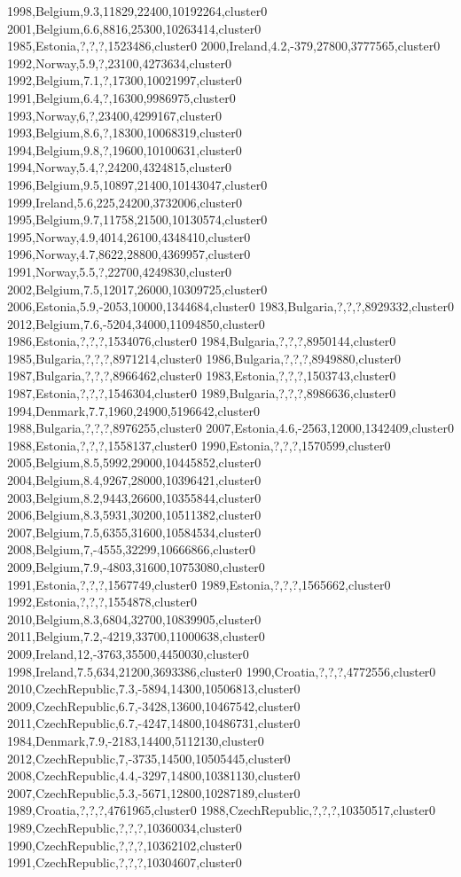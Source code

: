 1998,Belgium,9.3,11829,22400,10192264,cluster0
2001,Belgium,6.6,8816,25300,10263414,cluster0
1985,Estonia,?,?,?,1523486,cluster0
2000,Ireland,4.2,-379,27800,3777565,cluster0
1992,Norway,5.9,?,23100,4273634,cluster0
1992,Belgium,7.1,?,17300,10021997,cluster0
1991,Belgium,6.4,?,16300,9986975,cluster0
1993,Norway,6,?,23400,4299167,cluster0
1993,Belgium,8.6,?,18300,10068319,cluster0
1994,Belgium,9.8,?,19600,10100631,cluster0
1994,Norway,5.4,?,24200,4324815,cluster0
1996,Belgium,9.5,10897,21400,10143047,cluster0
1999,Ireland,5.6,225,24200,3732006,cluster0
1995,Belgium,9.7,11758,21500,10130574,cluster0
1995,Norway,4.9,4014,26100,4348410,cluster0
1996,Norway,4.7,8622,28800,4369957,cluster0
1991,Norway,5.5,?,22700,4249830,cluster0
2002,Belgium,7.5,12017,26000,10309725,cluster0
2006,Estonia,5.9,-2053,10000,1344684,cluster0
1983,Bulgaria,?,?,?,8929332,cluster0
2012,Belgium,7.6,-5204,34000,11094850,cluster0
1986,Estonia,?,?,?,1534076,cluster0
1984,Bulgaria,?,?,?,8950144,cluster0
1985,Bulgaria,?,?,?,8971214,cluster0
1986,Bulgaria,?,?,?,8949880,cluster0
1987,Bulgaria,?,?,?,8966462,cluster0
1983,Estonia,?,?,?,1503743,cluster0
1987,Estonia,?,?,?,1546304,cluster0
1989,Bulgaria,?,?,?,8986636,cluster0
1994,Denmark,7.7,1960,24900,5196642,cluster0
1988,Bulgaria,?,?,?,8976255,cluster0
2007,Estonia,4.6,-2563,12000,1342409,cluster0
1988,Estonia,?,?,?,1558137,cluster0
1990,Estonia,?,?,?,1570599,cluster0
2005,Belgium,8.5,5992,29000,10445852,cluster0
2004,Belgium,8.4,9267,28000,10396421,cluster0
2003,Belgium,8.2,9443,26600,10355844,cluster0
2006,Belgium,8.3,5931,30200,10511382,cluster0
2007,Belgium,7.5,6355,31600,10584534,cluster0
2008,Belgium,7,-4555,32299,10666866,cluster0
2009,Belgium,7.9,-4803,31600,10753080,cluster0
1991,Estonia,?,?,?,1567749,cluster0
1989,Estonia,?,?,?,1565662,cluster0
1992,Estonia,?,?,?,1554878,cluster0
2010,Belgium,8.3,6804,32700,10839905,cluster0
2011,Belgium,7.2,-4219,33700,11000638,cluster0
2009,Ireland,12,-3763,35500,4450030,cluster0
1998,Ireland,7.5,634,21200,3693386,cluster0
1990,Croatia,?,?,?,4772556,cluster0
2010,CzechRepublic,7.3,-5894,14300,10506813,cluster0
2009,CzechRepublic,6.7,-3428,13600,10467542,cluster0
2011,CzechRepublic,6.7,-4247,14800,10486731,cluster0
1984,Denmark,7.9,-2183,14400,5112130,cluster0
2012,CzechRepublic,7,-3735,14500,10505445,cluster0
2008,CzechRepublic,4.4,-3297,14800,10381130,cluster0
2007,CzechRepublic,5.3,-5671,12800,10287189,cluster0
1989,Croatia,?,?,?,4761965,cluster0
1988,CzechRepublic,?,?,?,10350517,cluster0
1989,CzechRepublic,?,?,?,10360034,cluster0
1990,CzechRepublic,?,?,?,10362102,cluster0
1991,CzechRepublic,?,?,?,10304607,cluster0
